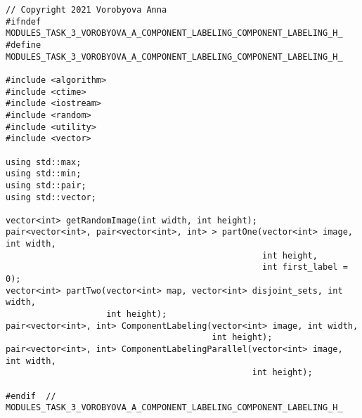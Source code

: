 \documentclass{report}
\begin{document}
\begin{lstlisting}
// Copyright 2021 Vorobyova Anna
#ifndef MODULES_TASK_3_VOROBYOVA_A_COMPONENT_LABELING_COMPONENT_LABELING_H_
#define MODULES_TASK_3_VOROBYOVA_A_COMPONENT_LABELING_COMPONENT_LABELING_H_

#include <algorithm>
#include <ctime>
#include <iostream>
#include <random>
#include <utility>
#include <vector>

using std::max;
using std::min;
using std::pair;
using std::vector;

vector<int> getRandomImage(int width, int height);
pair<vector<int>, pair<vector<int>, int> > partOne(vector<int> image, int width,
                                                   int height,
                                                   int first_label = 0);
vector<int> partTwo(vector<int> map, vector<int> disjoint_sets, int width,
                    int height);
pair<vector<int>, int> ComponentLabeling(vector<int> image, int width,
                                         int height);
pair<vector<int>, int> ComponentLabelingParallel(vector<int> image, int width,
                                                 int height);

#endif  // MODULES_TASK_3_VOROBYOVA_A_COMPONENT_LABELING_COMPONENT_LABELING_H_
\end{lstlisting}
\end{document}
